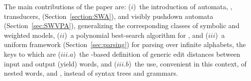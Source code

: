 The main contributions of the paper are:
($i$)~the introduction of automata, \SWA, transducers, \SWT (Section~\ref{section:SWA}),
and visibly pushdown automata \SWVPA (Section~\ref{sec:SWVPA}),
generalizing the corresponding classes of symbolic and weighted models,
($ii$)~a polynomial best-search algorithm for \SWVPA, %
and ($iii$)~a uniform framework (Section~\ref{sec:parsing}) for parsing over infinite alphabets,
the keys to which are
($iii.a$)~the \SWT-based definition of generic edit distances between input and output (yield) words,
and ($iii.b$)~the use, convenient in this context,
of nested words, and \SWVPA,
instead of syntax trees and grammars. %


